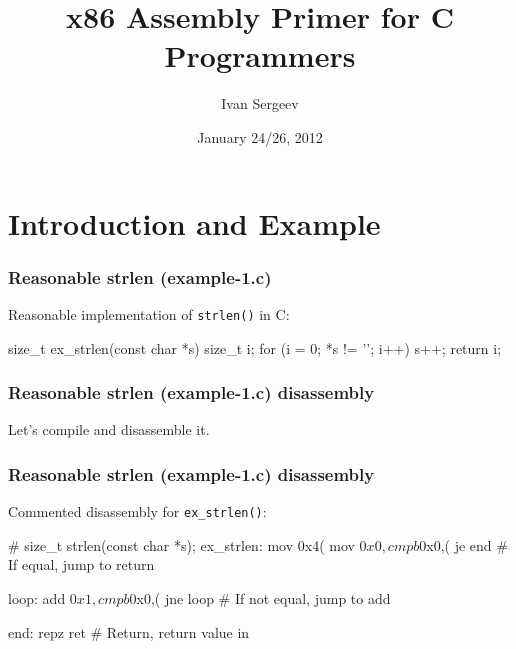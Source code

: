\documentclass[11pt,xcolor=dvipsnames]{beamer}
\newcommand{\vs}{\vspace{0.5em}}
\begin{document}
\title{x86 Assembly Primer for C Programmers}
\author{Ivan Sergeev}
\date{January 24/26, 2012}

\begin{frame}[plain]
  \titlepage
\end{frame}

\section*{Introduction and Example}

\begin{frame}[fragile,t]
\frametitle{Reasonable strlen (example-1.c)}
Reasonable implementation of \verb+strlen()+ in C:\vs
\begin{ccode}
size_t ex_strlen(const char *s) {
    size_t i;
    for (i = 0; *s != '\0'; i++)
        s++;
    return i;
}
\end{ccode}
\end{frame}

\begin{frame}[fragile,t]
\frametitle{Reasonable strlen (example-1.c) disassembly}
Let's compile and disassemble it.\vs
{}
\end{frame}

\begin{frame}[fragile,t]
\frametitle{Reasonable strlen (example-1.c) disassembly}
Commented disassembly for \verb+ex_strlen()+:\vs
\begin{gascode}
# size_t strlen(const char *s);
ex_strlen:
  mov    0x4(%
  mov    $0x0,%
  cmpb   $0x0,(%
  je     end                  #    If equal, jump to return

  loop:
    add    $0x1,%
    cmpb   $0x0,(%
    jne    loop               #    If not equal, jump to add

  end:
    repz ret                  # Return, return value in %
\end{gascode}
\end{frame}
\end{document}
